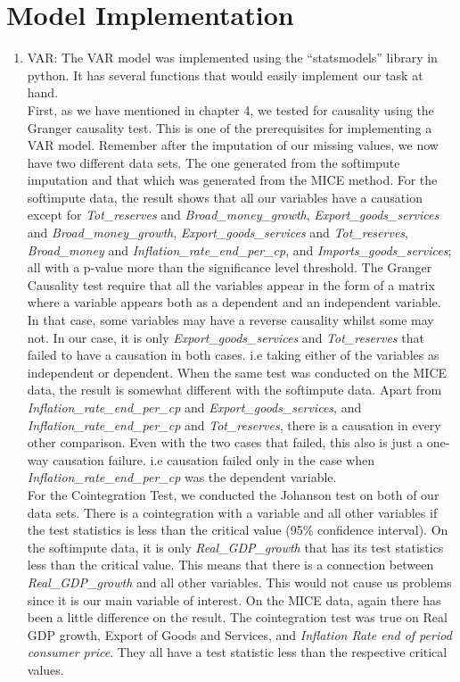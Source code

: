 \documentclass[12pt,italian, twoside]{report}
\begin{document}
\section{Model Implementation}
\begin{enumerate}
	\item VAR: The VAR model was implemented using the “statsmodels” library in python. It has several functions that would easily implement our task at hand.
\\
	First, as we have mentioned in chapter 4, we tested for causality using the Granger causality test. This is one of the prerequisites for implementing a VAR model. Remember after the imputation of our missing values, we now have two different data sets. The one generated from the softimpute imputation and that which was generated from the MICE method. For the softimpute data, the result shows that all our variables have a causation except for \textit{Tot\_reserves} and \textit{Broad\_money\_growth}, \textit{Export\_goods\_services} and \textit{Broad\_money\_growth}, \textit{Export\_goods\_services} and \textit{Tot\_reserves}, \textit{Broad\_money} and \textit{Inflation\_rate\_end\_per\_cp}, and \textit{Imports\_goods\_services}; all with a p-value more than the significance level threshold. The Granger Causality test require that all the variables appear in the form of a matrix where a variable appears both as a dependent and an independent variable. In that case, some variables may have a reverse causality whilst some may not. In our case, it is only \textit{Export\_goods\_services} and \textit{Tot\_reserves} that failed to have a causation in both cases. i.e taking either of the variables as independent or dependent. When the same test was conducted on the MICE data, the result is somewhat different with the softimpute data. Apart from \textit{Inflation\_rate\_end\_per\_cp} and \textit{Export\_goods\_services}, and \textit{Inflation\_rate\_end\_per\_cp} and \textit{Tot\_reserves}, there is a causation in every other comparison. Even with the two cases that failed, this also is just a one-way causation failure. i.e causation failed only in the case when \textit{Inflation\_rate\_end\_per\_cp} was the dependent variable.
\\
	For the Cointegration Test, we conducted the Johanson test on both of our data sets. There is a cointegration with a variable and all other variables if the test statistics is less than the critical value (95\% confidence interval). On the softimpute data, it is only \textit{Real\_GDP\_growth} that has its test statistics less than the critical value. This means that there is a connection between  \textit{Real\_GDP\_growth} and all other variables. This would not cause us problems since it is our main variable of interest. On the MICE data, again there has been a little difference on the result. The cointegration test was true on Real GDP growth, Export of Goods and Services, and \textit{Inflation Rate end of period consumer price}. They all have a test statistic less than the respective critical values.

\end{enumerate}
\end{document}

